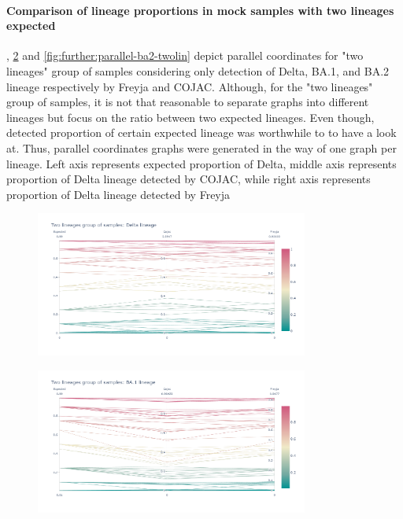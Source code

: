         \paragraph{Comparison of lineage proportions in mock samples with two lineages expected} \label{sec:appendix:figures:parallel-twolin}
        , \cref{fig:further:parallel-ba1-twolin} and \cref{fig:further:parallel-ba2-twolin} depict parallel coordinates for "two lineages" group of samples considering only detection of Delta, BA.1, and BA.2 lineage respectively by Freyja and COJAC. Although, for the "two lineages" group of samples, it is not that reasonable to separate graphs into different lineages but focus on the ratio between two expected lineages. Even though, detected proportion of certain expected lineage was worthwhile to to have a look at. Thus, parallel coordinates graphs were generated in the way of one graph per lineage. Left axis represents expected proportion of Delta, middle axis represents proportion of Delta lineage detected by COJAC, while right axis represents proportion of Delta lineage detected by Freyja
        \begin{figure}[ht!]
        	\centering
            \includegraphics[width=0.8\textwidth]{figures/further/pc-twolin-delta.png}
            \label{fig:further:parallel-delta-twolin}
        \end{figure}
        \begin{figure}[ht!]
        	\centering
            \includegraphics[width=0.8\textwidth]{figures/further/pc-twolin-ba1.png}
            \label{fig:further:parallel-ba1-twolin}
        \end{figure}
